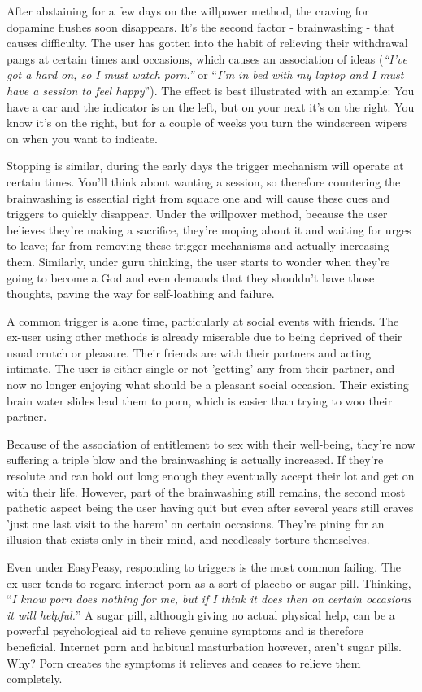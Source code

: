 \documentclass[
]{book}
\begin{document}
After abstaining for a few days on the willpower method, the craving for dopamine flushes soon disappears. It's the second factor - brainwashing - that causes difficulty. The user has gotten into the habit of relieving their withdrawal pangs at certain times and occasions, which causes an association of ideas (\emph{``I've got a hard on, so I must watch porn.''} or ``\emph{I'm in bed with my laptop and I must have a session to feel happy}''). The effect is best illustrated with an example: You have a car and the indicator is on the left, but on your next it's on the right. You know it's on the right, but for a couple of weeks you turn the windscreen wipers on when you want to indicate.

Stopping is similar, during the early days the trigger mechanism will operate at certain times. You'll think about wanting a session, so therefore countering the brainwashing is essential right from square one and will cause these cues and triggers to quickly disappear. Under the willpower method, because the user believes they're making a sacrifice, they're moping about it and waiting for urges to leave; far from removing these trigger mechanisms and actually increasing them. Similarly, under guru thinking, the user starts to wonder when they're going to become a God and even demands that they shouldn't have those thoughts, paving the way for self-loathing and failure.

A common trigger is alone time, particularly at social events with friends. The ex-user using other methods is already miserable due to being deprived of their usual crutch or pleasure. Their friends are with their partners and acting intimate. The user is either single or not 'getting' any from their partner, and now no longer enjoying what should be a pleasant social occasion. Their existing brain water slides lead them to porn, which is easier than trying to woo their partner.

Because of the association of entitlement to sex with their well-being, they're now suffering a triple blow and the brainwashing is actually increased. If they're resolute and can hold out long enough they eventually accept their lot and get on with their life. However, part of the brainwashing still remains, the second most pathetic aspect being the user having quit but even after several years still craves 'just one last visit to the harem' on certain occasions. They're pining for an illusion that exists only in their mind, and needlessly torture themselves.

Even under EasyPeasy, responding to triggers is the most common failing. The ex-user tends to regard internet porn as a sort of placebo or sugar pill. Thinking, ``\emph{I know porn does nothing for me, but if I think it does then on certain occasions it will helpful.}'' A sugar pill, although giving no actual physical help, can be a powerful psychological aid to relieve genuine symptoms and is therefore beneficial. Internet porn and habitual masturbation however, aren't sugar pills. Why? Porn creates the symptoms it relieves and ceases to relieve them completely.
\end{document}
